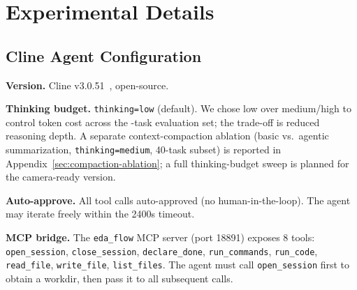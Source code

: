 ﻿\section{Experimental Details}
\label{sec:experimental-details}

\subsection{Cline Agent Configuration}
\label{sec:cline-config}

\textbf{Version.} Cline v3.0.51~\cite{cline2026}, open-source.

\textbf{Thinking budget.} \texttt{thinking=low} (default). We chose low over medium/high to control token cost across the \Ncases{}-task evaluation set; the trade-off is reduced reasoning depth. A separate context-compaction ablation (basic vs.\ agentic summarization, \texttt{thinking=medium}, 40-task subset) is reported in Appendix~\ref{sec:compaction-ablation}; a full thinking-budget sweep is planned for the camera-ready version.

\textbf{Auto-approve.} All tool calls auto-approved (no human-in-the-loop). The agent may iterate freely within the 2400s timeout.

{\sloppy \textbf{MCP bridge.} The \texttt{eda\_flow} MCP server (port 18891) exposes 8 tools: \texttt{open\_session}, \texttt{close\_session}, \texttt{declare\_done}, \texttt{run\_commands}, \texttt{run\_code}, \texttt{read\_file}, \texttt{write\_file}, \texttt{list\_files}. The agent must call \texttt{open\_session} first to obtain a workdir, then pass it to all subsequent calls.\par}

